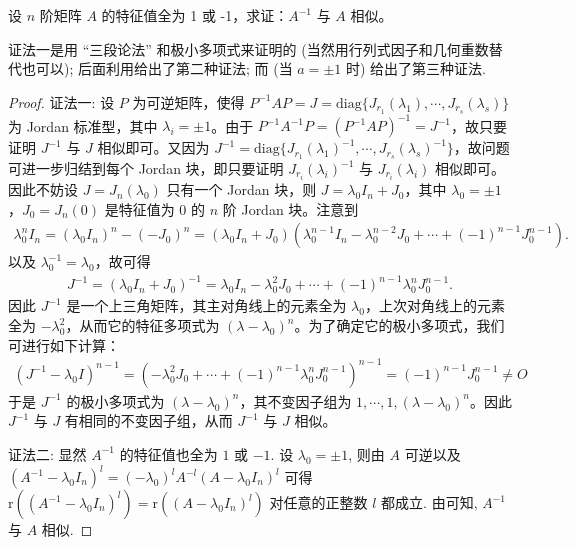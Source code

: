 \documentclass[../../main.tex]{subfiles}%
\begin{document}
\begin{proposition}\label{example:特征值全为正负1的矩阵的逆与其自身相似}
设 \(n\) 阶矩阵 \(A\) 的特征值全为 1 或 -1，求证：\(A^{-1}\) 与 \(A\) 相似。
\end{proposition}
\begin{remark}
{\color{blue}证法一}是用 “三段论法” 和极小多项式来证明的 (当然用行列式因子和几何重数替代也可以); 后面利用给出了第二种证法; 而 (当 $a = \pm 1$ 时) 给出了第三种证法. 
\end{remark}
\begin{proof}

{\color{blue}证法一:}
设 \(P\) 为可逆矩阵，使得 \(P^{-1}AP = J=\mathrm{diag}\{J_{r_1}(\lambda_1),\cdots,J_{r_s}(\lambda_s)\}\) 为 Jordan 标准型，其中 \(\lambda_i = \pm1\)。由于 \(P^{-1}A^{-1}P=(P^{-1}AP)^{-1}=J^{-1}\)，故只要证明 \(J^{-1}\) 与 \(J\) 相似即可。又因为 \(J^{-1}=\mathrm{diag}\{J_{r_1}(\lambda_1)^{-1},\cdots,J_{r_s}(\lambda_s)^{-1}\}\)，故问题可进一步归结到每个 Jordan 块，即只要证明 \(J_{r_i}(\lambda_i)^{-1}\) 与 \(J_{r_i}(\lambda_i)\) 相似即可。因此不妨设 \(J = J_n(\lambda_0)\) 只有一个 Jordan 块，则 \(J = \lambda_0I_n+J_0\)，其中 \(\lambda_0 = \pm1\)，\(J_0 = J_n(0)\) 是特征值为 0 的 \(n\) 阶 Jordan 块。注意到
\begin{align*}
\lambda_0^nI_n=(\lambda_0I_n)^n-(-J_0)^n
=(\lambda_0I_n + J_0)(\lambda_0^{n - 1}I_n-\lambda_0^{n - 2}J_0+\cdots+(-1)^{n - 1}J_0^{n - 1}).
\end{align*}
以及 \(\lambda_0^{-1}=\lambda_0\)，故可得
\begin{align*}
J^{-1}=(\lambda_0I_n + J_0)^{-1}=\lambda_0I_n-\lambda_0^2J_0+\cdots+(-1)^{n - 1}\lambda_0^nJ_0^{n - 1}.
\end{align*}
因此 \(J^{-1}\) 是一个上三角矩阵，其主对角线上的元素全为 \(\lambda_0\)，上次对角线上的元素全为 \(-\lambda_0^2\)，从而它的特征多项式为 \((\lambda - \lambda_0)^n\)。为了确定它的极小多项式，我们可进行如下计算：
\begin{align*}
(J^{-1}-\lambda_0I)^{n - 1}=(-\lambda_0^2J_0+\cdots+(-1)^{n - 1}\lambda_0^nJ_0^{n - 1})^{n - 1}=(-1)^{n - 1}J_0^{n - 1}\neq O
\end{align*}
于是 \(J^{-1}\) 的极小多项式为 \((\lambda - \lambda_0)^n\)，其不变因子组为 \(1,\cdots,1,(\lambda - \lambda_0)^n\)。因此 \(J^{-1}\) 与 \(J\) 有相同的不变因子组，从而 \(J^{-1}\) 与 \(J\) 相似。

{\color{blue}证法二:}
显然 $A^{-1}$ 的特征值也全为 $1$ 或 $-1$. 设 $\lambda_0 = \pm 1$, 则由 $A$ 可逆以及 $(A^{-1} - \lambda_0 I_n)^l = (-\lambda_0)^lA^{-l}(A - \lambda_0 I_n)^l$ 可得 $\mathrm{r}((A^{-1} - \lambda_0 I_n)^l) = \mathrm{r}((A - \lambda_0 I_n)^l)$ 对任意的正整数 $l$ 都成立. 由可知, $A^{-1}$ 与 $A$ 相似.

\end{proof}
\end{document}
